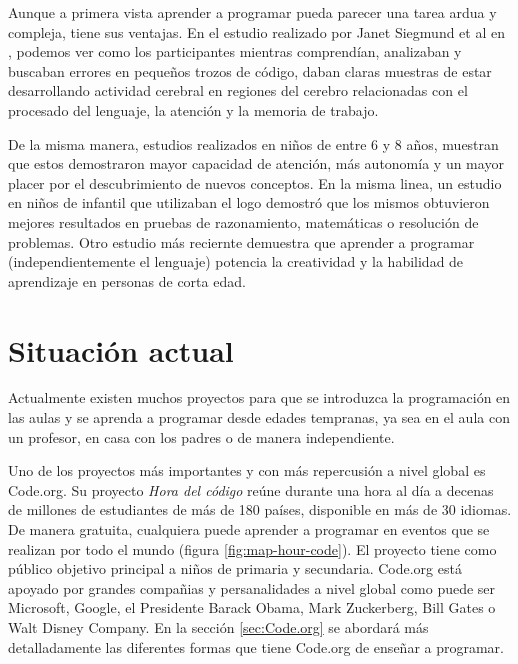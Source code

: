 Aunque a primera vista aprender a programar pueda parecer una tarea ardua y compleja, tiene sus ventajas. En el estudio realizado por Janet Siegmund {\color{red}et al} en \cite{siegmund2014understanding}, podemos ver como los participantes mientras comprendían, analizaban y buscaban errores en pequeños trozos de código, daban claras muestras de estar desarrollando actividad cerebral en regiones del cerebro relacionadas con el procesado del lenguaje, la atención y la memoria de trabajo.

De la misma manera, estudios realizados en niños \cite{clements1986effects} de entre 6 y 8 años, muestran que estos demostraron mayor capacidad de atención, más autonomía y un mayor placer por el descubrimiento de nuevos conceptos. En la misma linea, un estudio en niños de infantil \cite{logo-geometry} que utilizaban el \Gls{logo} demostró que los mismos obtuvieron mejores resultados en pruebas de razonamiento, matemáticas o resolución de problemas. Otro estudio más reciernte \cite{liao1991effects} demuestra que aprender a programar (independientemente el lenguaje) potencia la creatividad y la habilidad de aprendizaje en personas de corta edad.



\section{Situación actual}
\label{sub:aprendiendo-programar}


Actualmente existen muchos proyectos para que se introduzca la programación en las aulas y se aprenda a programar desde edades tempranas, ya sea en el aula con un profesor, en casa con los padres o de manera independiente. 


Uno de los proyectos más importantes y con más repercusión a nivel global es Code.org\cite{code-org}. Su proyecto \emph{Hora del código}\cite{hour-of-code} reúne durante una hora al día a decenas de millones de estudiantes de más de 180 países, disponible en más de 30 idiomas. De manera gratuita, cualquiera puede aprender a programar en eventos que se realizan por todo el mundo (figura \ref{fig:map-hour-code}). El proyecto tiene como público objetivo principal a niños de primaria y secundaria. Code.org está apoyado por grandes compañias y persanalidades a nivel global como puede ser Microsoft, Google, el Presidente Barack Obama, Mark Zuckerberg, Bill Gates o Walt Disney Company. {\color{red}En la sección \ref{sec:Code.org} se abordará más detalladamente las diferentes formas que tiene Code.org de enseñar a programar.}


